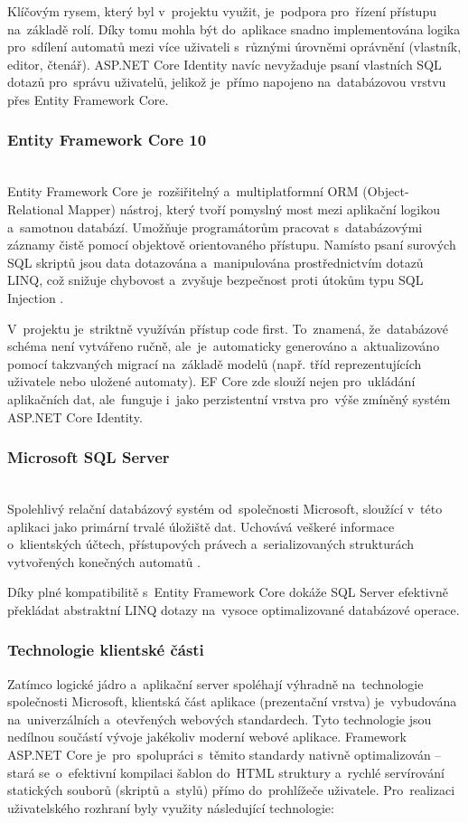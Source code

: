 \documentclass[
  master,
  program=ainfvs,
  printversion,
  figures=false,
  tables=false,
  glossaries,
  index
]{kidiplom}
\begin{document}
Klíčovým rysem, který byl v~projektu využit, je~podpora pro~řízení přístupu na~základě rolí. Díky tomu mohla být do~aplikace snadno implementována logika pro~sdílení automatů mezi více uživateli s~různými úrovněmi oprávnění (vlastník, editor, čtenář). ASP.NET Core Identity navíc nevyžaduje psaní vlastních SQL dotazů pro~správu uživatelů, jelikož je~přímo napojeno na~databázovou vrstvu přes Entity Framework Core.

\subsubsection{Entity Framework Core 10} \mbox{} \\
Entity Framework Core je~rozšiřitelný a~multiplatformní ORM (Object-Relational Mapper) nástroj, který tvoří pomyslný most mezi aplikační logikou a~samotnou databází. Umožňuje programátorům pracovat s~databázovými záznamy čistě pomocí objektově orientovaného přístupu. Namísto psaní surových SQL skriptů jsou data dotazována a~manipulována prostřednictvím \csharp{} dotazů LINQ, což snižuje chybovost a~zvyšuje bezpečnost proti útokům typu SQL Injection \cite{ms_efcore}.

V~projektu je~striktně využíván přístup code first. To~znamená, že~databázové schéma není vytvářeno ručně, ale~je~automaticky generováno a~aktualizováno pomocí takzvaných migrací na~základě \csharp{} modelů (např. tříd reprezentujících uživatele nebo uložené automaty). EF Core zde slouží nejen pro~ukládání aplikačních dat, ale~funguje i~jako perzistentní vrstva pro~výše zmíněný systém ASP.NET Core Identity.

\subsubsection{Microsoft SQL Server} \mbox{} \\
Spolehlivý relační databázový systém od~společnosti Microsoft, sloužící v~této aplikaci jako primární trvalé úložiště dat. Uchovává veškeré informace o~klientských účtech, přístupových právech a~serializovaných strukturách vytvořených konečných automatů \cite{ms_sql}. 

Díky plné kompatibilitě s~Entity Framework Core dokáže SQL Server efektivně překládat abstraktní LINQ dotazy na~vysoce optimalizované databázové operace. 

\subsubsection{Technologie klientské části}
Zatímco logické jádro a~aplikační server spoléhají výhradně na~technologie společnosti Microsoft, klientská část aplikace (prezentační vrstva) je~vybudována na~univerzálních a~otevřených webových standardech. Tyto technologie jsou nedílnou součástí vývoje jakékoliv moderní webové aplikace. Framework ASP.NET Core je~pro~spolupráci s~těmito standardy nativně optimalizován – stará se~o~efektivní kompilaci šablon do~HTML struktury a~rychlé servírování statických souborů (skriptů a~stylů) přímo do~prohlížeče uživatele. Pro~realizaci uživatelského rozhraní byly využity následující technologie:
\end{document}
